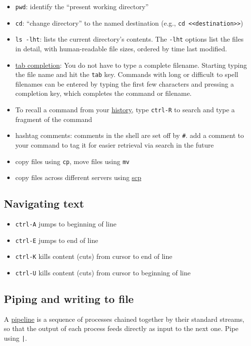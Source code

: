 \begin{itemize}
	\item \texttt{pwd}: identify the ``present working directory''
	\item \texttt{cd}: ``change directory'' to the named destination (e.g., \texttt{cd <<destination>>})
	\item \texttt{ls -lht}: lists the current directory's contents. The \texttt{-lht} options list the files in detail, with human-readable file sizes, ordered by time last modified.
	\item \href{https://en.wikipedia.org/wiki/Command-line_completion}{tab completion}:
	You do not have to type a complete filename. Starting typing the file name and hit the \texttt{tab} key.
	Commands with long or difficult to spell filenames can be entered by typing the first few characters and pressing a completion key, which completes the command or filename.
	\item To recall a command from your \href{https://www.howtogeek.com/howto/44997/how-to-use-bash-history-to-improve-your-command-line-productivity/}{history}, type \texttt{ctrl-R} to search and type a fragment of the command
	\item hashtag comments: comments in the shell are set off by \texttt{\#}. add a comment to your command to tag it for easier retrieval via search in the future
	\item copy files using \texttt{cp}, move files using \texttt{mv}
	\item copy files across different servers using \href{https://kb.iu.edu/d/agye}{scp}
\end{itemize}

\subsection{Navigating text}

\begin{itemize}
	\item \texttt{ctrl-A} jumps to beginning of line
	\item \texttt{ctrl-E} jumps to end of line
	\item \texttt{ctrl-K} kills content (cuts) from cursor to end of line
	\item \texttt{ctrl-U} kills content (cuts) from cursor to beginning of line
\end{itemize}

\subsection{Piping and writing to file}
A \href{https://en.wikipedia.org/wiki/Pipeline_(Unix)}{pipeline} is a sequence of processes chained together by their standard streams, so that the output of each process feeds directly as input to the next one.
Pipe using \texttt{|}.

